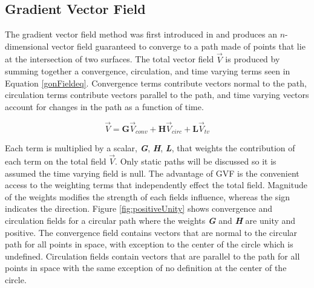 \documentclass[numbered,pdftex]{ohio-etd}
\begin{document}
\subsection{Gradient Vector Field}
The gradient vector field method was first introduced in \cite{goncalves_artificial_2009} and produces an $n$-dimensional vector field guaranteed to converge to a path made of points that lie at the intersection of two surfaces. The total vector field $\vec{V}$ is produced by summing together a convergence, circulation, and time varying terms seen in Equation \ref{gonFieldeq}. Convergence terms contribute vectors normal to the path, circulation terms contribute vectors parallel to the path, and time varying vectors account for changes in the path as a function of time. 

\begin{equation}
\vec{V} = \boldsymbol{G}\vec{V}_{conv} + \boldsymbol{H}\vec{V}_{circ} +  \boldsymbol{L}\vec{V}_{tv} 
\label{gonAllComp}
\end{equation}

Each term is multiplied by a scalar, \textit{\textbf{G}}, \textit{\textbf{H}}, \textit{\textbf{L}}, that weights the contribution of each term on the total field $\vec{V}$. Only static paths will be discussed so it is assumed the time varying field is null. The advantage of GVF is the convenient access to the weighting terms that independently effect the total field. Magnitude of the weights modifies the strength of each fields influence, whereas the sign indicates the direction. Figure \ref{fig:positiveUnity} shows convergence and circulation fields for a circular path where the weights \textit{\textbf{G}} and \textit{\textbf{H}} are unity and positive. The convergence field contains vectors that are normal to the circular path for all points in space, with exception to the center of the circle which is undefined. Circulation fields contain vectors that are parallel to the path for all points in space with the same exception of no definition at the center of the circle. 
\end{document}
